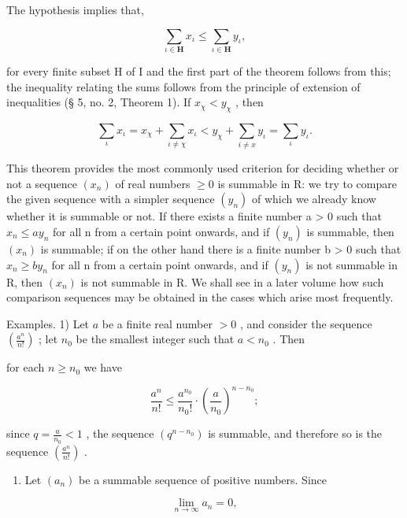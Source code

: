 The hypothesis implies that,

\[
\sum_ {\iota \in \mathbf {H}} x _ {\iota} \leqslant \sum_ {\iota \in \mathbf {H}} y _ {\iota},
\]

for every finite subset H of I and the first part of the theorem follows from this; the inequality relating the sums follows from the principle of extension of inequalities (§ 5, no. 2, Theorem 1). If \(x_{\chi} < y_{\chi}\) , then

\[
\sum_ {\iota} x _ {\iota} = x _ {\chi} + \sum_ {\iota \neq \chi} x _ {\iota} <   y _ {\chi} + \sum_ {i \neq x} y _ {\iota} = \sum_ {\iota} y _ {\iota}.
\]

This theorem provides the most commonly used criterion for deciding whether or not a sequence \((x_{n})\) of real numbers \(\geqslant0\) is summable in R: we try to compare the given sequence with a simpler sequence \((y_{n})\) of which we already know whether it is summable or not. If there exists a finite number a \textgreater{} 0 such that \(x_{n} \leqslant ay_{n}\) for all n from a certain point onwards, and if \((y_{n})\) is summable, then \((x_{n})\) is summable; if on the other hand there is a finite number b \textgreater{} 0 such that \(x_{n} \geqslant by_{n}\) for all n from a certain point onwards, and if \((y_{n})\) is not summable in R, then \((x_{n})\) is not summable in R. We shall see in a later volume how such comparison sequences may be obtained in the cases which arise most frequently.

Examples. 1) Let \(a\) be a finite real number \(>0\) , and consider the sequence \(\left(\frac{a^n}{n!}\right)\) ; let \(n_0\) be the smallest integer such that \(a < n_0\) . Then

for each \(n \geqslant n_0\) we have

\[
\frac {a ^ {n}}{n !} \leqslant \frac {a ^ {n _ {0}}}{n _ {0} !} \cdot \left(\frac {a}{n _ {0}}\right) ^ {n - n _ {0}};
\]

since \(q = \frac{a}{n_0} < 1\) , the sequence \((q^{n - n_0})\) is summable, and therefore so is the sequence \(\left(\frac{a^n}{n!}\right)\) .

\begin{enumerate}
\def\labelenumi{\arabic{enumi})}
\setcounter{enumi}{1}
\tightlist
\item
  Let \((a_{n})\) be a summable sequence of positive numbers. Since
\end{enumerate}

\[
\lim _ {n \rightarrow \infty} a _ {n} = 0,
\]

